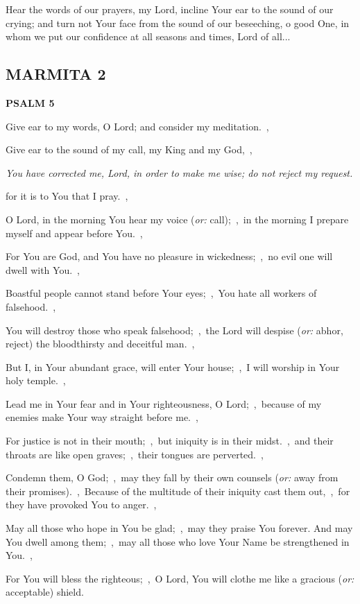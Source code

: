 \documentclass[12pt,twoside,a5paper]{article}
\newcommand{\marmita}[1]{\subsection*{MARMITA {#1}}}
\newcommand{\psalm}[1]{\textbf{PSALM {#1}}\nopagebreak}
\newcommand{\qanona}[1]{{\liturgicalhint{Qanona.} \emph{#1}}}
\newcommand{\slota}[1]{\liturgicalhint{Slota.} #1}
\newcommand{\translationoption}[1]{\emph{or:} #1}
\begin{document}
\slota{Hear the words of our prayers, my Lord, incline Your ear to the sound of our crying; and turn not Your face from the sound of our beseeching, o good One, in whom we put our confidence at all seasons and times, Lord of all...}

\marmita{2}

\psalm{5}

\begin{normalparskip}
  Give ear to my words, O Lord; and consider my meditation.~\sep

  Give ear to the sound of my call, my King and my God,~\sep

  \qanona{You have corrected me, Lord, in order to make me wise; do not reject my request.}

  for it is to You that I pray.~\sep

  O Lord, in the morning You hear my voice (\translationoption{call});~\sep\ in the morning I prepare myself and appear before You.~\sep

  For You are God, and You have no pleasure in wickedness;~\sep\ no evil one will dwell with You.~\sep

  Boastful people cannot stand before Your eyes;~\sep\ You hate all workers of falsehood.~\sep

  You will destroy those who speak falsehood;~\sep\ the Lord will despise (\translationoption{abhor, reject}) the bloodthirsty and deceitful man.~\sep

  But I, in Your abundant grace, will enter Your house;~\sep\ I will worship in Your holy temple.~\sep

  Lead me in Your fear and in Your righteousness, O Lord;~\sep\ because of my enemies make Your way straight before me.~\sep

  For justice is not in their mouth;~\sep\ but iniquity is in their midst.~\sep\ and their throats are like open graves;~\sep\ their tongues are perverted.~\sep

  Condemn them, O God;~\sep\ may they fall by their own counsels (\translationoption{away from their promises}).~\sep\ Because of the multitude of their iniquity cast them out,~\sep\ for they have provoked You to anger.~\sep

  May all those who hope in You be glad;~\sep\ may they praise You forever. And may You dwell among them;~\sep\ may all those who love Your Name be strengthened in You.~\sep

  For You will bless the righteous;~\sep\ O Lord, You will clothe me like a gracious (\translationoption{acceptable}) shield.
\end{normalparskip}
\end{document}
